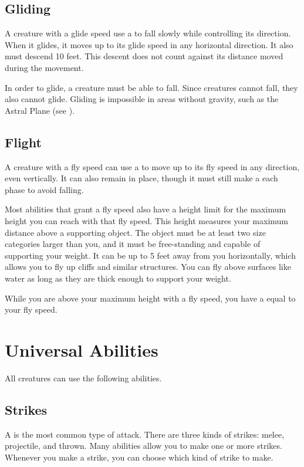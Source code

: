     \subsection{Gliding}\label{Gliding}
        A creature with a glide speed use a  to fall slowly while controlling its direction.
        When it glides, it moves up to its glide speed in any horizontal direction.
        It also must descend 10 feet.
        This descent does not count against its distance moved during the movement.

        In order to glide, a creature must be able to fall.
        Since  creatures cannot fall, they also cannot glide.
        Gliding is impossible in areas without gravity, such as the Astral Plane (see ).

    \subsection{Flight}\label{Flight}
        A creature with a fly speed can use a  to move up to its fly speed in any direction, even vertically.
        It can also remain in place, though it must still make a  each phase to avoid falling.

         Most abilities that grant a fly speed also have a height limit for the maximum height you can reach with that fly speed.
        This height measures your maximum distance above a supporting object.
        The object must be at least two size categories larger than you, and it must be free-standing and capable of supporting your weight.
        It can be up to 5 feet away from you horizontally, which allows you to fly up cliffs and similar structures.
        You can fly above surfaces like water as long as they are thick enough to support your weight.

        While you are above your maximum height with a fly speed, you have a  equal to your fly speed.

\section{Universal Abilities}\label{Universal Abilities}
    All creatures can use the following abilities.

    \subsection{Strikes}\label{Strikes}
        A  is the most common type of attack.
        There are three kinds of strikes: melee, projectile, and thrown.
        Many abilities allow you to make one or more strikes.
        Whenever you make a strike, you can choose which kind of strike to make.

